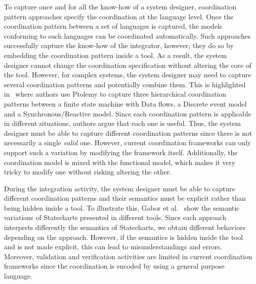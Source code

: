 To capture once and for all the know-how of a system designer, coordination pattern approaches specify the coordination at the language level. Once the coordination pattern between a set of languages is captured, the models conforming to such languages can be coordinated automatically. Such approaches successfully capture the know-how of the integrator, however, they do so by embedding the coordination pattern inside a tool. As a result, the system designer cannot change the coordination specification without altering the core of the tool. However, for complex systems, the system designer may need to capture several coordination patterns and potentially combine them. This is highlighted in~\cite{giraultcompo} where authors use Ptolemy to capture three hierarchical coordination patterns between a finite state machine with Data flows, a Discrete event model and a Synchronous/Reactive model. Since each coordination pattern is applicable in different situations, authors argue that each one is useful. Thus, the system designer must be able to capture different coordination patterns since there is not necessarily a single \emph{valid} one. However, current coordination frameworks can only support such a variation by modifying the framework itself. Additionally, the coordination model is mixed with the functional model, which makes it very tricky to modify one without risking altering the other.
	
During the integration activity, the system designer must be able to capture different coordination patterns and their semantics must be explicit rather than being hidden inside a tool. To illustrate this, Gabor et al.~\cite{gaborpolyglot} show the semantic variations of Statecharts presented in different tools. Since each approach interprets differently the semantics of Statecharts, we obtain different behaviors depending on the approach. However, if the semantics is hidden inside the tool and is not made explicit, this can lead to misunderstandings and errors. Moreover, validation and verification activities are limited in current coordination frameworks since the coordination is encoded by using a general purpose language.
	